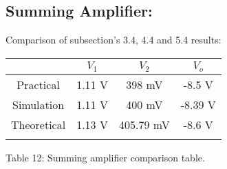 \subsection{Summing Amplifier:}

Comparison of subsection's 3.4, 4.4 and 5.4 results: \hfill \break

\begin{center}
\begin{tabular}[.5cm]{c c c c}
\toprule
\toprule
& \hspace{55pt} $V_{1}$ \hspace{55pt} & \hspace{55pt} $V_{2}$ \hspace{55pt} & \hspace{55pt} $V_{o}$ \hspace{55pt}  \\
\midrule
\midrule
Practical & 1.11 V & 398 mV & -8.5 V \\
\cmidrule{1-4}
Simulation & 1.11 V & 400 mV & -8.39 V \\
\cmidrule{1-4}
Theoretical & 1.13 V & 405.79 mV & -8.6 V \\
\bottomrule
\linebreak
\end{tabular}
\linebreak Table 12: Summing amplifier comparison table.
\end{center} \hfill